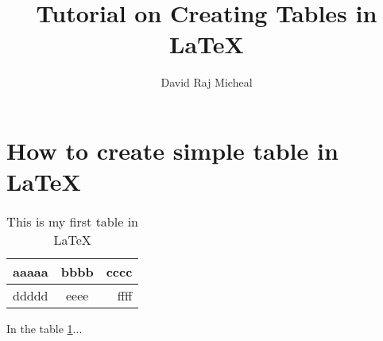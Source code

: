 \documentclass{article}
\title{Tutorial on Creating Tables in \LaTeX}
\author{David Raj Micheal}
\begin{document}
\maketitle

\section{How to create simple table in \LaTeX}

\begin{table}[htb!]
	\centering 
	\caption{This is my first table in \LaTeX}
	\label{tab:my_table}
\begin{tabular}{|l|c|r|}
	\hline 
 aaaaa & bbbb & cccc \\
 \hline 
 ddddd  & eeee & ffff \\
 \hline 
\end{tabular}
\end{table}

In the table \ref{tab:my_table}...
\end{document}

